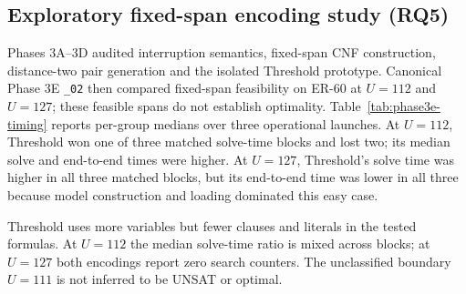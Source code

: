 \subsection{Exploratory fixed-span encoding study (RQ5)}
Phases 3A--3D audited interruption semantics, fixed-span CNF construction,
distance-two pair generation and the isolated Threshold prototype.
Canonical Phase 3E \texttt{\_02} then compared fixed-span feasibility on
ER-60 at $U=112$ and $U=127$; these feasible spans do not establish
optimality. Table~\ref{tab:phase3e-timing} reports per-group medians over
three operational launches. At $U=112$, Threshold won one of three
matched solve-time blocks and lost two; its median solve and end-to-end
times were higher. At $U=127$, Threshold's solve time was higher in all
three matched blocks, but its end-to-end time was lower in all three
because model construction and loading dominated this easy case.
\begin{table}[htbp]
\centering\scriptsize
\caption{Phase 3E fixed-span sizes and timing medians.}
\label{tab:phase3e-timing}

\end{table}
\begin{table}[htbp]
\centering\scriptsize
\caption{Phase 3E recorded RSS field and median solver counters.}
\label{tab:phase3e-counters}

\end{table}
Threshold uses more variables but fewer clauses and literals in the
tested formulas. At $U=112$ the median solve-time ratio is mixed across
blocks; at $U=127$ both encodings report zero search counters. The
unclassified boundary $U=111$ is not inferred to be UNSAT or optimal.


